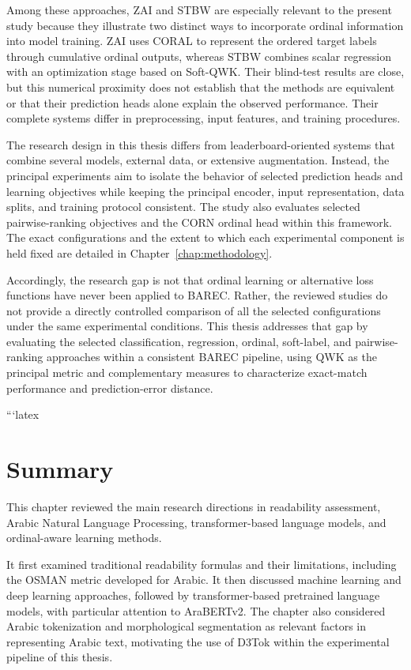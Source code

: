 \documentclass[12pt]{report}
\begin{document}
Among these approaches, ZAI and STBW are especially relevant to the present study because they illustrate two distinct ways to incorporate ordinal information into model training. ZAI uses CORAL to represent the ordered target labels through cumulative ordinal outputs, whereas STBW combines scalar regression with an optimization stage based on Soft-QWK. Their blind-test results are close, but this numerical proximity does not establish that the methods are equivalent or that their prediction heads alone explain the observed performance. Their complete systems differ in preprocessing, input features, and training procedures.

The research design in this thesis differs from leaderboard-oriented systems that combine several models, external data, or extensive augmentation. Instead, the principal experiments aim to isolate the behavior of selected prediction heads and learning objectives while keeping the principal encoder, input representation, data splits, and training protocol consistent. The study also evaluates selected pairwise-ranking objectives and the CORN ordinal head within this framework. The exact configurations and the extent to which each experimental component is held fixed are detailed in Chapter~\ref{chap:methodology}.

Accordingly, the research gap is not that ordinal learning or alternative loss functions have never been applied to BAREC. Rather, the reviewed studies do not provide a directly controlled comparison of all the selected configurations under the same experimental conditions. This thesis addresses that gap by evaluating the selected classification, regression, ordinal, soft-label, and pairwise-ranking approaches within a consistent BAREC pipeline, using QWK as the principal metric and complementary measures to characterize exact-match performance and prediction-error distance.

```latex
\section{Summary}
\label{sec:literature-summary}

This chapter reviewed the main research directions in readability assessment, Arabic Natural Language Processing, transformer-based language models, and ordinal-aware learning methods.

It first examined traditional readability formulas and their limitations, including the OSMAN metric developed for Arabic. It then discussed machine learning and deep learning approaches, followed by transformer-based pretrained language models, with particular attention to AraBERTv2. The chapter also considered Arabic tokenization and morphological segmentation as relevant factors in representing Arabic text, motivating the use of D3Tok within the experimental pipeline of this thesis.
\end{document}
